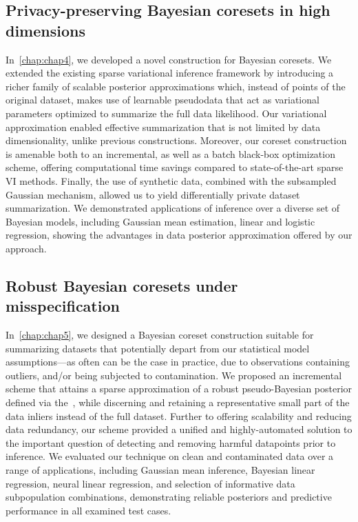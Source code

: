 \subsection{Privacy-preserving Bayesian coresets in high dimensions}
\label{subsec:ch4-summary}
In~\cref{chap:chap4}, we developed a novel construction for Bayesian coresets. We extended the existing sparse variational inference framework by introducing a richer family of scalable posterior approximations which, instead of points of the original dataset, makes use of learnable pseudodata that act as variational parameters optimized to summarize the full data likelihood. Our variational approximation enabled effective summarization that is not limited by data dimensionality, unlike previous constructions. Moreover, our coreset construction is amenable both to an incremental, as well as a batch black-box optimization scheme, offering computational time savings compared to state-of-the-art sparse VI methods. Finally, the use of synthetic data, combined with the subsampled Gaussian mechanism, allowed us to yield differentially private dataset summarization. We demonstrated applications of inference over a diverse set of Bayesian models, including Gaussian mean estimation, linear and logistic regression, showing the advantages in data posterior approximation offered by our approach.

\subsection{Robust Bayesian coresets under misspecification}
\label{subsec:ch4-summary}
In~\cref{chap:chap5}, we designed a Bayesian coreset construction suitable for summarizing datasets that potentially depart from our statistical model assumptions---as often can be the case in practice, due to observations containing outliers, and/or being subjected to contamination. We proposed an incremental scheme that attains a sparse approximation of a robust pseudo-Bayesian posterior defined via the~\bdiv, while discerning and retaining a representative small part of the data inliers instead of the full dataset. Further to offering scalability and reducing data redundancy, our scheme provided a unified and highly-automated solution to the important question of detecting and removing harmful datapoints prior to inference. We evaluated our technique on clean and contaminated data over a range of applications, including Gaussian mean inference, Bayesian linear regression, neural linear regression, and selection of informative data subpopulation combinations, demonstrating reliable posteriors and predictive performance in all examined test cases.


